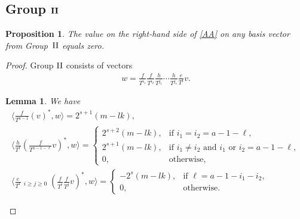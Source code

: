\documentclass[pdftex]{sigma}
\numberwithin{equation}{section}
\newtheorem{lem}[thm]{Lemma}
\newtheorem{prop}[thm]{Proposition}
{\theoremstyle{definition}
\newtheorem*{rem}{Remark}}
\begin{document}
\subsection[Group ${\rm II}$]{Group $\boldsymbol{{\rm II}}$}\label{subsec group 2}
\begin{prop}\label{Pr2}The value on the right-hand side of \eqref{AA} on any basis vector from Group~${\rm II}$ equals zero.
\end{prop}
\begin{proof}Group ${\rm II}$ consists of vectors
\begin{gather*}
w=\frac{f}{T^{i_1}}\frac{f}{T^{i_2}}\frac{h}{T^{j_1}} \cdots \frac{h}{T^{j_s}} \frac{e}{T^l}v.
\end{gather*}

\begin{lem}\label{Group 2} We have
\begin{gather}
\bigg\langle \frac{f}{T^{a-1}} (v)^*, w \bigg\rangle = 2^{s+1} (m - lk), \label{G21} \\
\bigg\langle \frac{h}{T^{\ell}} \left(\frac{f}{T^{a-1-\ell}}v\right)^*, w \bigg\rangle =
 \begin{cases}
 2^{s+2} (m - lk), & \text{if $i_1 = i_2 = a-1-\ell$},\\
 2^{s+1} (m - lk), & \text{if $i_1 \ne i_2$ and $i_{1}$ or $i_2 = a-1-\ell$}, \\
 0, & \text{otherwise},
 \end{cases} \label{G22} \\
\bigg\langle \frac{e}{T^{\ell}}
\mathop{\sum_{i+j=a-1-\ell}}_{i\geq j\geq 0} \left(\frac{f}{T^i}\frac{f}{T^j}v\right)^*, w \bigg\rangle =
 \begin{cases}
 - 2^{s} (m - lk), & \text{if $\ell = a-1 - i_1 - i_2$},\\
 0, & \text{otherwise}.
 \end{cases} \label{G23}
\end{gather}
\end{lem}


\end{proof}
\end{document}
